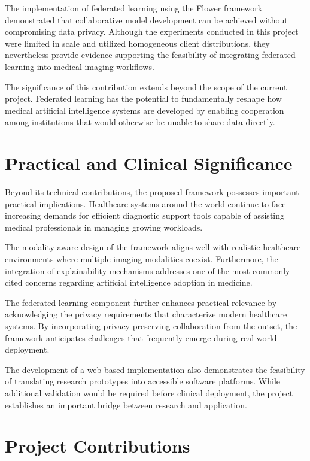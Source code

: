 The implementation of federated learning using the Flower framework demonstrated that collaborative model development can be achieved without compromising data privacy. Although the experiments conducted in this project were limited in scale and utilized homogeneous client distributions, they nevertheless provide evidence supporting the feasibility of integrating federated learning into medical imaging workflows.

The significance of this contribution extends beyond the scope of the current project. Federated learning has the potential to fundamentally reshape how medical artificial intelligence systems are developed by enabling cooperation among institutions that would otherwise be unable to share data directly.

\section{Practical and Clinical Significance}

Beyond its technical contributions, the proposed framework possesses important practical implications. Healthcare systems around the world continue to face increasing demands for efficient diagnostic support tools capable of assisting medical professionals in managing growing workloads.

The modality-aware design of the framework aligns well with realistic healthcare environments where multiple imaging modalities coexist. Furthermore, the integration of explainability mechanisms addresses one of the most commonly cited concerns regarding artificial intelligence adoption in medicine.

The federated learning component further enhances practical relevance by acknowledging the privacy requirements that characterize modern healthcare systems. By incorporating privacy-preserving collaboration from the outset, the framework anticipates challenges that frequently emerge during real-world deployment.

The development of a web-based implementation also demonstrates the feasibility of translating research prototypes into accessible software platforms. While additional validation would be required before clinical deployment, the project establishes an important bridge between research and application.

\section{Project Contributions}


